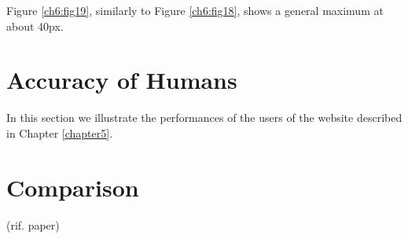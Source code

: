 Figure \ref{ch6:fig19}, similarly to Figure \ref{ch6:fig18}, shows a general maximum at about 40px.


\vspace{0.5cm}


\section{Accuracy of Humans}

In this section we illustrate the performances of the users of the website described in Chapter \ref{chapter5}. 

\vspace{0.5cm}

\section{Comparison}

(rif. paper)

